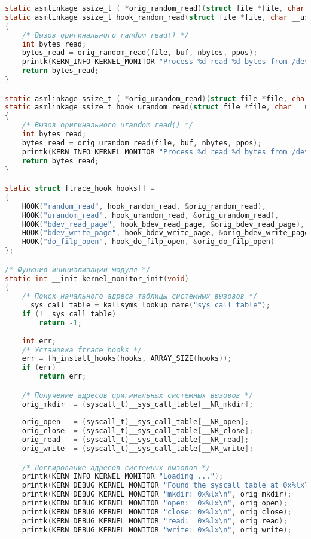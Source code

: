 \begin{lstlisting}[language=C, label=lst:kernel_monitor_c, caption=kernel\_monitor.c.]
static asmlinkage ssize_t ( *orig_random_read)(struct file *file, char __user *buf, size_t nbytes, loff_t *ppos);
static asmlinkage ssize_t hook_random_read(struct file *file, char __user *buf, size_t nbytes, loff_t *ppos)
{
    /* Вызов оригинального random_read() */
    int bytes_read;
    bytes_read = orig_random_read(file, buf, nbytes, ppos);
    printk(KERN_INFO KERNEL_MONITOR "Process %d read %d bytes from /dev/random\n", current->pid, bytes_read);
    return bytes_read;
}

static asmlinkage ssize_t ( *orig_urandom_read)(struct file *file, char __user *buf, size_t nbytes, loff_t *ppos);
static asmlinkage ssize_t hook_urandom_read(struct file *file, char __user *buf, size_t nbytes, loff_t *ppos)
{
    /* Вызов оригинального urandom_read() */
    int bytes_read;
    bytes_read = orig_urandom_read(file, buf, nbytes, ppos);
    printk(KERN_INFO KERNEL_MONITOR "Process %d read %d bytes from /dev/urandom\n", current->pid, bytes_read);    
    return bytes_read;
}

static struct ftrace_hook hooks[] = 
{
    HOOK("random_read", hook_random_read, &orig_random_read),
    HOOK("urandom_read", hook_urandom_read, &orig_urandom_read),
    HOOK("bdev_read_page", hook_bdev_read_page, &orig_bdev_read_page),
    HOOK("bdev_write_page", hook_bdev_write_page, &orig_bdev_write_page),
    HOOK("do_filp_open", hook_do_filp_open, &orig_do_filp_open)
};

/* Функция инициализации модуля */
static int __init kernel_monitor_init(void)
{
    /* Поиск начального адреса таблицы системных вызовов */
    __sys_call_table = kallsyms_lookup_name("sys_call_table");
    if (!__sys_call_table)
        return -1;
    
    int err;
    /* Установка ftrace hooks */
    err = fh_install_hooks(hooks, ARRAY_SIZE(hooks));
    if (err)
        return err;

    /* Получение адресов оригинальных системных вызовов */
    orig_mkdir  = (syscall_t)__sys_call_table[__NR_mkdir];
    
    orig_open   = (syscall_t)__sys_call_table[__NR_open];
    orig_close  = (syscall_t)__sys_call_table[__NR_close];
    orig_read   = (syscall_t)__sys_call_table[__NR_read];
    orig_write  = (syscall_t)__sys_call_table[__NR_write];

    /* Логгирование адресов системных вызовов */
    printk(KERN_INFO KERNEL_MONITOR "Loading ...");
    printk(KERN_DEBUG KERNEL_MONITOR "Found the syscall table at 0x%lx\n", __sys_call_table);
    printk(KERN_DEBUG KERNEL_MONITOR "mkdir: 0x%lx\n", orig_mkdir);
    printk(KERN_DEBUG KERNEL_MONITOR "open:  0x%lx\n", orig_open);
    printk(KERN_DEBUG KERNEL_MONITOR "close: 0x%lx\n", orig_close);
    printk(KERN_DEBUG KERNEL_MONITOR "read:  0x%lx\n", orig_read);
    printk(KERN_DEBUG KERNEL_MONITOR "write: 0x%lx\n", orig_write);


\end{lstlisting}
